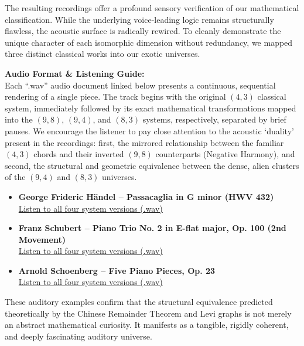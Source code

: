 \documentclass[11pt,letterpaper]{amsart}
\begin{document}
The resulting recordings offer a profound sensory verification of our mathematical classification. While the underlying voice-leading logic remains structurally flawless, the acoustic surface is radically rewired. To cleanly demonstrate the unique character of each isomorphic dimension without redundancy, we mapped three distinct classical works into our exotic universes. 

\vspace{0.2cm}
\noindent\textbf{Audio Format \& Listening Guide:}\\
Each ``.wav'' audio document linked below presents a continuous, sequential rendering of a single piece. The track begins with the original $(4,3)$ classical system, immediately followed by its exact mathematical transformations mapped into the $(9,8)$, $(9,4)$, and $(8,3)$ systems, respectively, separated by brief pauses. We encourage the listener to pay close attention to the acoustic `duality' present in the recordings: first, the mirrored relationship between the familiar $(4,3)$ chords and their inverted $(9,8)$ counterparts (Negative Harmony), and second, the structural and geometric equivalence between the dense, alien clusters of the $(9,4)$ and $(8,3)$ universes.

\begin{itemize}
    \item \textbf{George Frideric Händel -- Passacaglia in G minor (HWV 432)}\\
    \href{https://www.fuw.edu.pl/~nurowski/Haendel_Passacaglia_in_G_minor_all_systems.wav}{Listen to all four system versions (.wav)}
    
    \vspace{0.2cm}
    \item \textbf{Franz Schubert -- Piano Trio No. 2 in E-flat major, Op. 100 (2nd Movement)}\\
    \href{https://www.fuw.edu.pl/~nurowski/Schubert_Piano_Trio_2mvt_all_systems.wav}{Listen to all four system versions (.wav)}
    
    \vspace{0.2cm}
    \item \textbf{Arnold Schoenberg -- Five Piano Pieces, Op. 23}\\
    \href{https://www.fuw.edu.pl/~nurowski/Schoenberg_Piano_Pieces_all_systems.wav}{Listen to all four system versions (.wav)}
\end{itemize}

These auditory examples confirm that the structural equivalence predicted theoretically by the Chinese Remainder Theorem and Levi graphs is not merely an abstract mathematical curiosity. It manifests as a tangible, rigidly coherent, and deeply fascinating auditory universe.
\end{document}
